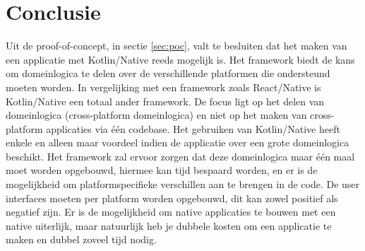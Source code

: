 
\chapter{Conclusie}
\label{ch:conclusie}


Uit de proof-of-concept, in sectie \ref{sec:poc}, valt te besluiten dat het maken van een applicatie met Kotlin/Native reeds mogelijk is. Het framework biedt de kans om domeinlogica te delen over de verschillende platformen die ondersteund moeten worden. In vergelijking met een framework zoals React/Native is Kotlin/Native een totaal ander framework. De focus ligt op het delen van domeinlogica (cross-platform domeinlogica) en niet op het maken van cross-platform applicaties via één codebase. Het gebruiken van Kotlin/Native heeft enkele en alleen maar voordeel indien de applicatie over een grote domeinlogica beschikt. Het framework zal ervoor zorgen dat deze domeinlogica maar één maal moet worden opgebouwd, hiermee kan tijd bespaard worden, en er is de mogelijkheid om platformspecifieke verschillen aan te brengen in de code. De user interfaces moeten per platform worden opgebouwd, dit kan zowel positief als negatief zijn. Er is de mogelijkheid om native applicaties te bouwen met een native uiterlijk, maar natuurlijk heb je dubbele kosten om een applicatie te maken en dubbel zoveel tijd nodig.

